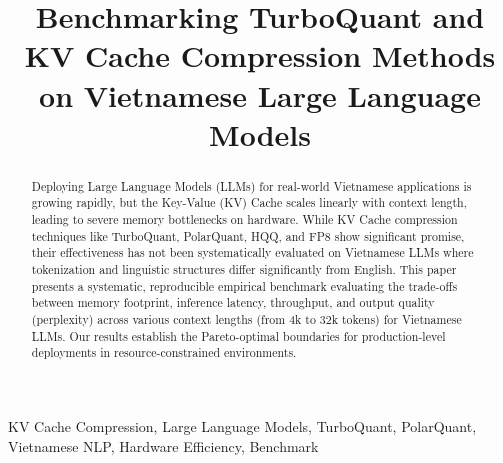 \documentclass[conference]{IEEEtran}
\begin{document}
\title{Benchmarking TurboQuant and KV Cache Compression Methods on Vietnamese Large Language Models}

\author{
}

\maketitle

\begin{abstract}
Deploying Large Language Models (LLMs) for real-world Vietnamese applications is growing rapidly, but the Key-Value (KV) Cache scales linearly with context length, leading to severe memory bottlenecks on hardware. While KV Cache compression techniques like TurboQuant, PolarQuant, HQQ, and FP8 show significant promise, their effectiveness has not been systematically evaluated on Vietnamese LLMs where tokenization and linguistic structures differ significantly from English. This paper presents a systematic, reproducible empirical benchmark evaluating the trade-offs between memory footprint, inference latency, throughput, and output quality (perplexity) across various context lengths (from 4k to 32k tokens) for Vietnamese LLMs. Our results establish the Pareto-optimal boundaries for production-level deployments in resource-constrained environments.
\end{abstract}

\begin{IEEEkeywords}
KV Cache Compression, Large Language Models, TurboQuant, PolarQuant, Vietnamese NLP, Hardware Efficiency, Benchmark
\end{IEEEkeywords}








\end{document}
